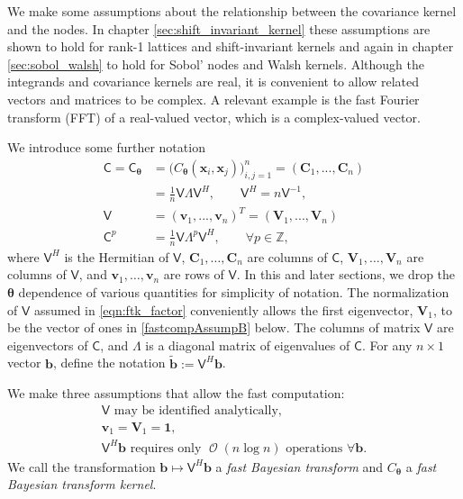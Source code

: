 \documentclass{iitthesis}          %
\DeclareMathOperator{\Order}{{\mathcal O}}
\newcommand{\bm}[1]{\boldsymbol{#1}}
\newcommand{\integers}{\mathbb{Z}}
\newcommand{\vtheta}{{\bm{\theta}}}
\newcommand{\vb}{\bm{b}}
\newcommand{\vC}{\bm{C}}
\newcommand{\vv}{\bm{v}}
\newcommand{\vV}{\bm{V}}
\newcommand{\vx}{\bm{x}}
\newcommand{\vone}{\bm{1}}
\newcommand{\mC}{\mathsf{C}}
\newcommand{\mCtheta}{{\mathsf{C}_{\vtheta}}}
\newcommand{\mLambda}{\mathsf{\Lambda}}
\newcommand{\mV}{\mathsf{V}}
\begin{document}

We make some assumptions about the relationship between the covariance kernel and the nodes. 
In chapter \ref{sec:shift_invariant_kernel} these assumptions are shown to hold  for rank-1 lattices and shift-invariant kernels and again in chapter \ref{sec:sobol_walsh} to hold for Sobol' nodes and Walsh kernels.  Although the integrands and covariance kernels are real, it is convenient to allow related vectors and matrices to be complex.  A relevant example is the fast Fourier transform (FFT) of a real-valued vector, which is a complex-valued vector.

We introduce some further notation
\begin{align}
\nonumber
\mC = \mCtheta &= \Big(C_\vtheta(\vx_i,\vx_j)\Big)_{i,j=1}^n  = (\vC_1,...,\vC_n) 
\\
\label{eqn:ftk_factor}
&= \frac 1n \mV \mLambda \mV^H , 
\quad \quad \mV^H = n \mV^{-1}, \\
\nonumber
\mV &= (\vv_1,...,\vv_n)^T = (\vV_1,...,\vV_n) \\
\nonumber
\mC^p  &= \frac 1n \mV \mLambda^{p} \mV^H, \qquad \forall p \in \integers,
\end{align}
where $\mV^H$ is the Hermitian of $\mV$, $\vC_1,\dots,\vC_n$ are columns of $\mC$,  $\vV_1,\dots,\vV_n$ are columns of $\mV$, and $\vv_1,\dots,\vv_n$ are rows of $\mV$.
In this and later sections, we drop the $\vtheta$ dependence of various quantities for simplicity of notation.  The normalization of $\mV$ assumed in \eqref{eqn:ftk_factor} conveniently allows the first eigenvector, $\vV_1$, to be the vector of ones in \eqref{fastcompAssumpB} below.  The columns of matrix $\mV$ are eigenvectors of $\mC$, and $\mLambda$ is a diagonal matrix of eigenvalues of $\mC$.
For any $n \times 1$ vector $\vb$, define the notation  $\widetilde{\vb} := \mV^H \vb$.

We make three assumptions that allow the fast computation:
\begin{subequations} \label{fastcompAssump}
	\begin{gather}
	\label{fastcompAssumpA}
	\mV \text{ may be identified analytically}, \\
	\label{fastcompAssumpB}
	\vv_1 = \vV_1 = \vone, \\
	\label{fastcompAssumpC}
	\mV^H \vb  \text{ requires only $\Order(n \log n)$ operations } \forall \vb.
	\end{gather}
\end{subequations}
We call the transformation $\vb \mapsto \mV^H \vb$ a \emph{fast Bayesian transform} and $C_\vtheta$ a \emph{fast Bayesian transform kernel}.  
\end{document}
